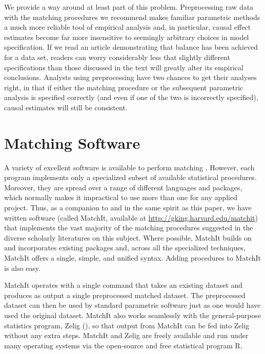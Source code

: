 \documentclass[11pt,titlepage]{article}
\begin{document}
We provide a way around at least part of this problem.  Preprocessing
raw data with the matching procedures we recommend makes familiar
parametric methods a much more reliable tool of empirical analysis
and, in particular, causal effect estimates become far more
insensitive to seemingly arbitrary choices in model specification.  If
we read an article demonstrating that balance has been achieved for a
data set, readers can worry considerably less that slightly different
specifications than those discussed in the text will greatly alter its
empirical conclusions.  Analysts using preprocessing have two chances
to get their analyses right, in that if either the matching procedure
or the subsequent parametric analysis is specified correctly (and even
if one of the two is incorrectly specified), causal estimates will
still be consistent.

\appendix
\section{Matching Software}\label{s:matchit}

A variety of excellent software is available to perform matching
\citep{AbaDruLeb02, BecIch02, BerKos03, Hansen05, LeuSia04, Parsons00,
  Parsons01, Sekhon04}.  However, each program implements only a
specialized subset of available statistical procedures.  Moreover,
they are spread over a range of different languages and packages,
which normally makes it impractical to use more than one for any
applied project.  Thus, as a companion to and in the same spirit as
this paper, we have written software (called MatchIt, available at
\url{http://gking.harvard.edu/matchit}) that implements the vast
majority of the matching procedures suggested in the diverse scholarly
literatures on this subject.  Where possible, MatchIt builds on and
incorporates existing packages and, across all the specialized
techniques, MatchIt offers a single, simple, and unified syntax.
Adding procedures to MatchIt is also easy.

MatchIt operates with a single command that takes an existing dataset
and produces as output a single preprocessed matched dataset.  The
preprocessed dataset can then be used by standard parametric software
just as one would have used the original dataset.  MatchIt also works
seamlessly with the general-purpose statistics program, Zelig
(\citealt{ImaKinLau06}), so that output from MatchIt can be fed into
Zelig without any extra steps.  MatchIt and Zelig are freely available
and run under many operating systems via the open-source and free
statistical program R.



\end{document}
